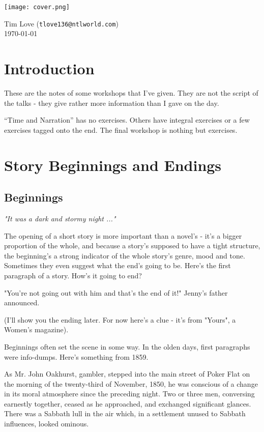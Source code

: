 \documentclass[11pt]{article}
\newenvironment{narrow}[2]{%
 \begin{list}{}{%
  \setlength{\topsep}{0pt}%
  \setlength{\leftmargin}{#1}%
  \setlength{\rightmargin}{#2}%
  \setlength{\listparindent}{\parindent}%
  \setlength{\itemindent}{\parindent}%
  \setlength{\parsep}{\parskip}%
 }%
\item[]}{\end{list}}
\begin{document}
\begin{center}
\texttt{[image: cover.png]}
\end{center}
\begin{flushright}
Tim Love (\texttt{tlove136{@}ntlworld.com})\\
\today
\end{flushright}
\newpage
\section*{Introduction}
These are the notes of some workshops that I've given. They are not the script
of the talks - they give rather more information than I gave on the day.

 ``Time and Narration'' has no exercises. Others  have integral exercises or a few exercises tagged onto the end.  The final workshop is nothing but exercises.


\tableofcontents


\newpage
\section{Story Beginnings and Endings }
\subsection*{Beginnings}
\textit{"It was a dark and stormy night ..."}



The opening of a short story is more important than a novel's - it's a bigger proportion of the whole, and because a story's supposed to have a tight structure, the beginning's a strong indicator of the whole story's genre, mood and tone. Sometimes they even suggest what the end's going to be. Here's the first paragraph of a story. How's it going to end?

\begin{narrow}{1.0cm}{1.0cm}
"You're not going out with him and that's the end of it!" Jenny's father
announced.
\end{narrow}

(I'll show you the ending later. For now here's a clue - it's from "Yours", a Women's magazine).




Beginnings often set the scene in some way. In the olden days, first paragraphs were info-dumps. Here's something from 1859.



\begin{narrow}{1.0cm}{1.0cm}
As Mr. John Oakhurst, gambler, stepped into the main street of Poker Flat on the morning of the twenty-third of November, 1850, he was conscious of a change in its moral atmosphere since the preceding night. Two or three men, conversing
earnestly together, ceased as he approached, and exchanged significant glances. There was a Sabbath lull in the air which, in a settlement unused to Sabbath influences, looked ominous.
\end{narrow}
\end{document}
